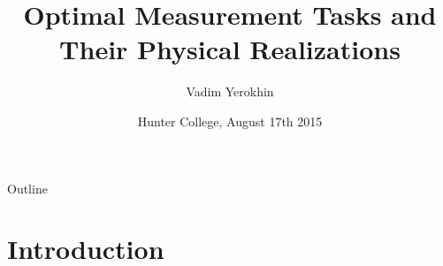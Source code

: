 \documentclass{beamer}
\title
{Optimal Measurement Tasks and Their Physical Realizations}
\author[Vadim Yerokhin] %
{Vadim Yerokhin }
\date[CFP 2003] %
{Hunter College, August 17th 2015 }
\begin{document}
\begin{frame}
  \titlepage
\end{frame}

\begin{frame}{Outline}
  \tableofcontents[pausesections]
\end{frame}





\section{Introduction}
\end{document}
